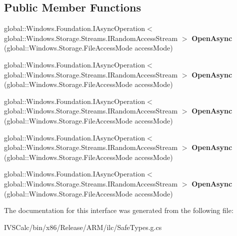 \subsection*{Public Member Functions}
\begin{DoxyCompactItemize}
\item 
\mbox{\label{interface_windows_1_1_storage_1_1_i_storage_file_a5f97cd220bc83e0b1cee3d56976575d5}} 
global\+::\+Windows.\+Foundation.\+I\+Async\+Operation$<$ global\+::\+Windows.\+Storage.\+Streams.\+I\+Random\+Access\+Stream $>$ {\bfseries Open\+Async} (global\+::\+Windows.\+Storage.\+File\+Access\+Mode access\+Mode)
\item 
\mbox{\label{interface_windows_1_1_storage_1_1_i_storage_file_a5f97cd220bc83e0b1cee3d56976575d5}} 
global\+::\+Windows.\+Foundation.\+I\+Async\+Operation$<$ global\+::\+Windows.\+Storage.\+Streams.\+I\+Random\+Access\+Stream $>$ {\bfseries Open\+Async} (global\+::\+Windows.\+Storage.\+File\+Access\+Mode access\+Mode)
\item 
\mbox{\label{interface_windows_1_1_storage_1_1_i_storage_file_a5f97cd220bc83e0b1cee3d56976575d5}} 
global\+::\+Windows.\+Foundation.\+I\+Async\+Operation$<$ global\+::\+Windows.\+Storage.\+Streams.\+I\+Random\+Access\+Stream $>$ {\bfseries Open\+Async} (global\+::\+Windows.\+Storage.\+File\+Access\+Mode access\+Mode)
\item 
\mbox{\label{interface_windows_1_1_storage_1_1_i_storage_file_a5f97cd220bc83e0b1cee3d56976575d5}} 
global\+::\+Windows.\+Foundation.\+I\+Async\+Operation$<$ global\+::\+Windows.\+Storage.\+Streams.\+I\+Random\+Access\+Stream $>$ {\bfseries Open\+Async} (global\+::\+Windows.\+Storage.\+File\+Access\+Mode access\+Mode)
\item 
\mbox{\label{interface_windows_1_1_storage_1_1_i_storage_file_a5f97cd220bc83e0b1cee3d56976575d5}} 
global\+::\+Windows.\+Foundation.\+I\+Async\+Operation$<$ global\+::\+Windows.\+Storage.\+Streams.\+I\+Random\+Access\+Stream $>$ {\bfseries Open\+Async} (global\+::\+Windows.\+Storage.\+File\+Access\+Mode access\+Mode)
\end{DoxyCompactItemize}


The documentation for this interface was generated from the following file\+:\begin{DoxyCompactItemize}
\item 
I\+V\+S\+Calc/bin/x86/\+Release/\+A\+R\+M/ilc/Safe\+Types.\+g.\+cs\end{DoxyCompactItemize}
